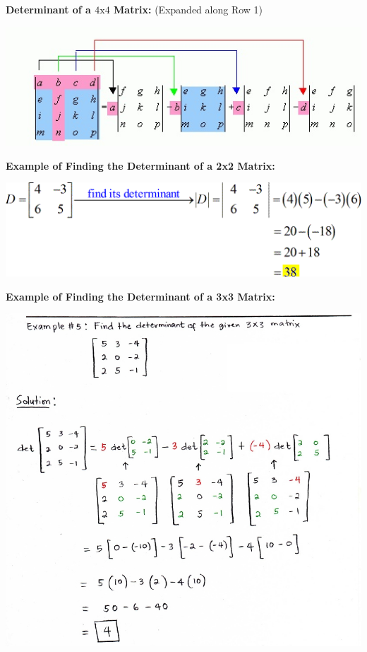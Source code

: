 \documentclass[12pt]{article}
\begin{document}
\textbf{Determinant of a $4\text{x}4$ Matrix:} (Expanded along Row 1)
\newline

\centerline{\includegraphics{Determinant4by4.jpg}}

\newpage

\textbf{Example of Finding the Determinant of a 2x2 Matrix:}

\centerline{\includegraphics[scale = 0.7]{Determinant2By2Example.png}}

\textbf{Example of Finding the Determinant of a 3x3 Matrix:}

\centerline{\includegraphics[scale = 0.6]{Determinant3By3Example.jpg}}
\end{document}
